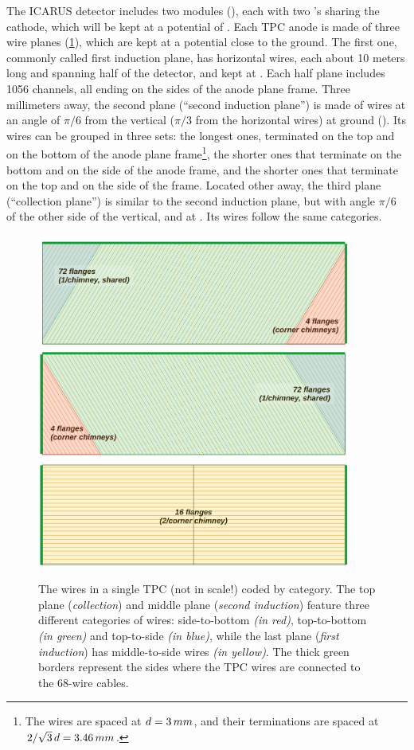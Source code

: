 The ICARUS detector includes two modules (\ICARUSmodule), each with two \TPC's
sharing the cathode, which will be kept at a potential of .
Each TPC anode is made of three wire planes (\cref{fig:WireCategories}),
which are kept at a potential close to the ground.
The first one, commonly called first induction plane, has horizontal wires, each
about 10 meters long and spanning half of the detector, and kept at .
Each half plane includes 1056 channels, all ending on the sides of the anode
plane frame.
Three millimeters away, the second plane (``second induction plane'') is made of
wires at an angle of $\pi/6$ from the vertical ($\pi/3$ from the horizontal
wires) at ground ().
Its wires can be grouped in three sets: the longest ones, terminated on the top
and on the bottom of the anode plane frame\footnote{%
The wires are spaced at $d=3\,mm$, and their terminations are spaced at
$2/\sqrt{3}\,d=3.46\,mm$.%
},
the shorter ones that terminate on the bottom and on the side of the anode
frame, and the shorter ones that terminate on the top and on the side of the
frame.
Located other  away, the third plane (``collection plane'') is similar to
the second induction plane, but with angle $\pi/6$ of the other side of the
vertical, and at . Its wires follow the same categories.
\begin{figure}
  {
    \centering
    \includegraphics[height=11cm,clip,trim=1 0 1 0]{fig/WireCategories}\\
  }
  \caption{
    The wires in a single TPC (not in scale!) coded by category. The top plane (\emph{collection}) and middle plane (\emph{second induction}) feature three different categories of wires: side-to-bottom \emph{(in red)}, top-to-bottom \emph{(in green)} and top-to-side \emph{(in blue)}, while the last plane (\emph{first induction}) has middle-to-side wires \emph{(in yellow)}. The thick green borders represent the sides where the TPC wires are connected to the 68-wire cables.
  }
  \label{fig:WireCategories}
\end{figure}
